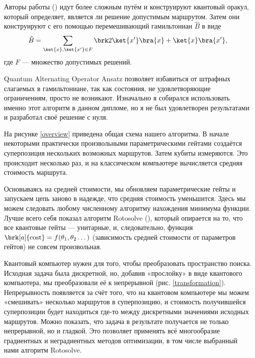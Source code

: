 Авторы работы \cite{oracle} (\citeyear{oracle}) идут более сложным путём и конструируют квантовый оракул, который определяет, является ли решение допустимым маршрутом. Затем они конструируют с его помощью перемешивающий гамильтониан $\hat B$ в виде
$$
\hat B = \sum_{\ket{x}, \ket{x'} \in F} \brk2{\ket{x'}\bra{x} + \ket{x}\bra{x'}},
$$
где $F$ --- множество допустимых решений.

Quantum Alternating Operator Ansatz позволяет избавиться от штрафных слагаемых в гамильтониане, так как состояния, не удовлетворяющие ограничениям, просто не возникают. Изначально я собирался использовать именно этот алгоритм в данном дипломе, но я не был удовлетворен результатами и разработал своё решение с нуля.


На рисунке \ref{overview} приведена общая схема нашего алгоритма. В начале некоторыми практически произвольными параметрическими гейтами создаётся суперпозиция нескольких возможных маршрутов. Затем кубиты измеряются. Это происходит несколько раз, и на классическом компьютере вычисляется средняя стоимость маршрута.


Основываясь на средней стоимости, мы обновляем параметрические гейты и запускаем цепь заново в надежде, что средняя стоимость уменьшится. Здесь мы можем следовать любому численному алгоритму нахождения минимума функции. 
Лучше всего себя показал алгоритм Rotosolve 
\cite{rotosolve} (\citeyear{rotosolve}),
который опирается на то, что все квантовые гейты --- унитарные, и, следовательно, функция $\brk[a]{\text{cost}} = f(\theta_1, \theta_2 \dots)$ (зависимость средней стоимости от параметров гейтов) не совсем произвольная.

Квантовый компьютер нужен для того, чтобы преобразовать пространство поиска. Исходная задача была дискретной, но, добавив «прослойку» в виде квантового компьютера, мы преобразовали её к непрерывной (рис. \ref{transformation}).
Непрерывность появляется за счёт того, что на квантовом компьютере мы можем «смешивать» несколько маршрутов в суперпозицию, и стоимость получившейся суперпозиции будет находиться где-то между дискретными значениями исходных маршрутов.
Можно показать, что задача в результате получается не только непрерывной, но и гладкой. Это позволяет применять всё многообразие градиентных и неградиентных методов оптимизации, в том числе выбранный нами алгоритм Rotosolve.

